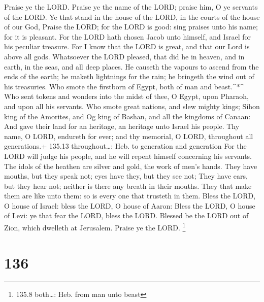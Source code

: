  Praise ye the LORD. Praise ye the name of the LORD; praise
him, O ye servants of the LORD.  Ye that stand in the house
of the LORD, in the courts of the house of our God,  Praise
the LORD; for the LORD is good: sing praises unto his name; for it is
pleasant.  For the LORD hath chosen Jacob unto himself, and
Israel for his peculiar treasure.  For I know that the LORD
is great, and that our Lord is above all gods.  Whatsoever
the LORD pleased, that did he in heaven, and in earth, in the seas, and
all deep places.  He causeth the vapours to ascend from the
ends of the earth; he maketh lightnings for the rain; he bringeth the
wind out of his treasuries.  Who smote the firstborn of
Egypt, both of man and beast.\^{}*\^{}  Who sent tokens and
wonders into the midst of thee, O Egypt, upon Pharaoh, and upon all his
servants.  Who smote great nations, and slew mighty kings;
 Sihon king of the Amorites, and Og king of Bashan, and all
the kingdoms of Canaan:  And gave their land for an
heritage, an heritage unto Israel his people.  Thy name, O
LORD, endureth for ever; and thy memorial, O LORD, throughout all
generations.+ 135.13 throughout\ldots: Heb. to generation and generation
 For the LORD will judge his people, and he will repent
himself concerning his servants.  The idols of the heathen
are silver and gold, the work of men's hands.  They have
mouths, but they speak not; eyes have they, but they see not;
 They have ears, but they hear not; neither is there any
breath in their mouths.  They that make them are like unto
them: so is every one that trusteth in them.  Bless the
LORD, O house of Israel: bless the LORD, O house of Aaron: 
Bless the LORD, O house of Levi: ye that fear the LORD, bless the LORD.
 Blessed be the LORD out of Zion, which dwelleth at
Jerusalem. Praise ye the LORD. \footnote{135.8 both\ldots: Heb. from man
  unto beast}

\hypertarget{section-136}{%
\section{136}\label{section-136}}

